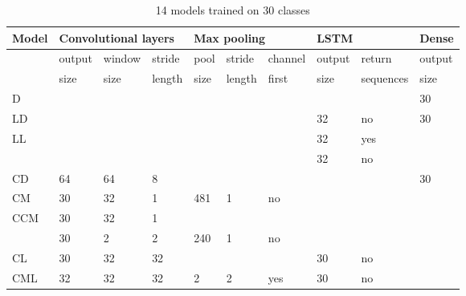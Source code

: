 \newcommand{\paint}{\cellcolor{gray!25}}
\begin{table}[!ht]
    \centering
    \footnotesize
    \caption{14 models trained on 30 classes}
    \label{tab:models}
\begin{tabular}{l||l|l|l||l|l|l||l|l||l}
\hline
Model  & \multicolumn{3}{l||}{Convolutional layers} & \multicolumn{3}{l||}{Max pooling} & \multicolumn{2}{l||}{LSTM} & Dense  \\ \hline
       & output       & window       & stride      & pool    & stride    & channel    & output     & return       & output \\ 
       & size         & size         & length      & size    & length    & first      & size       & sequences    & size   \\ \hline
                                                                                                                              \hline
D      & \paint       & \paint       &     \paint  & \paint  &  \paint   & \paint     & \paint     & \paint       & 30     \\ \hline
LD     & \paint       & \paint       &     \paint  & \paint  &  \paint   & \paint     & 32         & no           & 30     \\ \hline
LL     & \paint       & \paint       &     \paint  & \paint  &  \paint   & \paint     & 32         & yes          & \paint \\ 
       & \paint       & \paint       &     \paint  & \paint  &  \paint   & \paint     & 32         & no           & \paint \\ \hline
CD     & 64           & 64           & 8           & \paint  &  \paint   & \paint     & \paint     & \paint       & 30     \\ \hline
CM     & 30           & 32           & 1           & 481     & 1         & no         &  \paint    & \paint       & \paint \\ \hline
CCM    & 30           & 32           & 1           &         &           &            & \paint     & \paint       & \paint \\ 
       & 30           & 2            & 2           & 240     & 1         & no         & \paint     & \paint       & \paint \\ \hline
CL     & 30           & 32           & 32          & \paint  &  \paint   & \paint     & 30         & no           & \paint \\ \hline
CML    & 32           & 32           & 32          & 2       & 2         & yes        & 30         & no           & \paint \\ \hline

\end{tabular}
\end{table}
